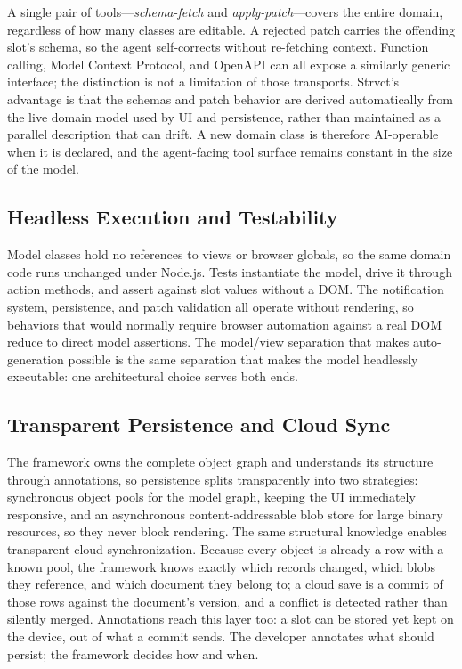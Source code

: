 \documentclass[sigplan,review,anonymous,10pt]{acmart}
\begin{document}
A single pair of tools---\emph{schema-fetch} and \emph{apply-patch}---covers the entire domain, regardless of how many classes are editable. A rejected patch carries the offending slot's schema, so the agent self-corrects without re-fetching context. Function calling, Model Context Protocol, and OpenAPI can all expose a similarly generic interface; the distinction is not a limitation of those transports. Strvct's advantage is that the schemas and patch behavior are derived automatically from the live domain model used by UI and persistence, rather than maintained as a parallel description that can drift. A new domain class is therefore AI-operable when it is declared, and the agent-facing tool surface remains constant in the size of the model.

\subsection{Headless Execution and Testability}

Model classes hold no references to views or browser globals, so the same domain code runs unchanged under Node.js. Tests instantiate the model, drive it through action methods, and assert against slot values without a DOM. The notification system, persistence, and patch validation all operate without rendering, so behaviors that would normally require browser automation against a real DOM reduce to direct model assertions. The model/view separation that makes auto-generation possible is the same separation that makes the model headlessly executable: one architectural choice serves both ends.

\subsection{Transparent Persistence and Cloud Sync}

The framework owns the complete object graph and understands its structure through annotations, so persistence splits transparently into two strategies: synchronous object pools for the model graph, keeping the UI immediately responsive, and an asynchronous content-addressable blob store for large binary resources, so they never block rendering. The same structural knowledge enables transparent cloud synchronization. Because every object is already a row with a known pool, the framework knows exactly which records changed, which blobs they reference, and which document they belong to; a cloud save is a commit of those rows against the document's version, and a conflict is detected rather than silently merged. Annotations reach this layer too: a slot can be stored yet kept on the device, out of what a commit sends. The developer annotates what should persist; the framework decides how and when.
\end{document}

